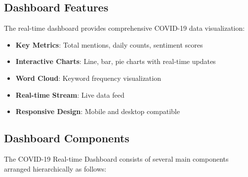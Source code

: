 \documentclass[12pt,a4paper]{article}
\begin{document}
\subsection{Dashboard Features}
The real-time dashboard provides comprehensive COVID-19 data visualization:

\begin{itemize}
    \item \textbf{Key Metrics}: Total mentions, daily counts, sentiment scores
    \item \textbf{Interactive Charts}: Line, bar, pie charts with real-time updates
    \item \textbf{Word Cloud}: Keyword frequency visualization
    \item \textbf{Real-time Stream}: Live data feed
    \item \textbf{Responsive Design}: Mobile and desktop compatible
\end{itemize}

\subsection{Dashboard Components}

The COVID-19 Real-time Dashboard consists of several main components arranged hierarchically as follows:
\end{document}
